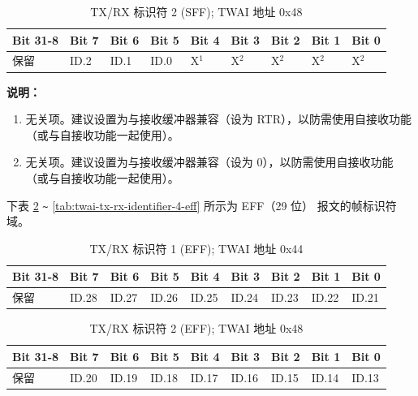 \documentclass[main\_\_CN.tex]{subfiles}
\begin{document}
\begin{longtable}[c]{|p{1.4cm}|p{1.4cm}|p{1.4cm}|p{1.4cm}|p{1.4cm}|p{1.4cm}|p{1.4cm}|p{1.4cm}|p{1.4cm}|}
    \caption{TX/RX 标识符 2 (SFF); TWAI 地址 0x48}
    \label{tab:twai-tx-rx-identifier-2-sff}\\
    \hline
       \rowcolor{lightgray}
    \textbf{Bit 31-8} & \textbf{Bit 7} & \textbf{Bit 6} & \textbf{Bit 5} & \textbf{Bit 4} & \textbf{Bit 3} & \textbf{Bit 2} & \textbf{Bit 1} & \textbf{Bit 0}\\\hline
    保留 & ID.2 & ID.1 & ID.0 & X$^1$ & X$^2$ & X$^2$ & X$^2$ & X$^2$\\
    \hline
\end{longtable}
\vspace{-1.5em}
{\bfseries 说明：}\\
\begin{enumerate}
    \item 无关项。建议设置为与接收缓冲器兼容（设为 RTR），以防需使用自接收功能（或与自接收功能一起使用）。
    \item 无关项。建议设置为与接收缓冲器兼容（设为 0），以防需使用自接收功能（或与自接收功能一起使用）。
\end{enumerate}

下表 \ref{tab:twai-tx-rx-identifier-1-eff} \verb+~+ \ref{tab:twai-tx-rx-identifier-4-eff} 所示为 EFF（29 位） 报文的帧标识符域。

\begin{longtable}[c]{|p{1.4cm}|p{1.4cm}|p{1.4cm}|p{1.4cm}|p{1.4cm}|p{1.4cm}|p{1.4cm}|p{1.4cm}|p{1.4cm}|}
    \caption{TX/RX 标识符 1 (EFF); TWAI 地址 0x44}
    \label{tab:twai-tx-rx-identifier-1-eff}\\
    \hline
       \rowcolor{lightgray}
    \textbf{Bit 31-8} & \textbf{Bit 7} & \textbf{Bit 6} & \textbf{Bit 5} & \textbf{Bit 4} & \textbf{Bit 3} & \textbf{Bit 2} & \textbf{Bit 1} & \textbf{Bit 0}\\\hline
    保留 & ID.28 & ID.27 & ID.26 & ID.25 & ID.24 & ID.23 & ID.22 & ID.21\\
    \hline
\end{longtable}

\begin{longtable}[c]{|p{1.4cm}|p{1.4cm}|p{1.4cm}|p{1.4cm}|p{1.4cm}|p{1.4cm}|p{1.4cm}|p{1.4cm}|p{1.4cm}|}
    \caption{TX/RX 标识符 2 (EFF); TWAI 地址 0x48}
    \label{tab:twai-tx-rx-identifier-2-eff}\\
    \hline
       \rowcolor{lightgray}
    \textbf{Bit 31-8} & \textbf{Bit 7} & \textbf{Bit 6} & \textbf{Bit 5} & \textbf{Bit 4} & \textbf{Bit 3} & \textbf{Bit 2} & \textbf{Bit 1} & \textbf{Bit 0}\\\hline
    保留 & ID.20 & ID.19 & ID.18 & ID.17 & ID.16 & ID.15 & ID.14 & ID.13\\
    \hline
\end{longtable}
\end{document}
